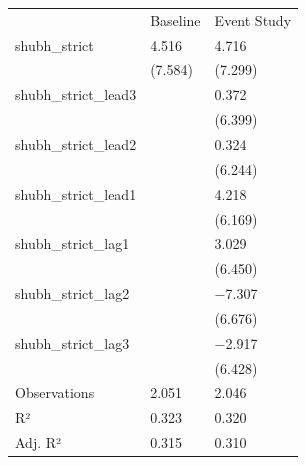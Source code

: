 \begin{tabular}{lll}
& Baseline & Event Study \\
shubh\_strict & \num{4.516} & \num{4.716} \\
& (\num{7.584}) & (\num{7.299}) \\
shubh\_strict\_lead3 &  & \num{0.372} \\
&  & (\num{6.399}) \\
shubh\_strict\_lead2 &  & \num{0.324} \\
&  & (\num{6.244}) \\
shubh\_strict\_lead1 &  & \num{4.218} \\
&  & (\num{6.169}) \\
shubh\_strict\_lag1 &  & \num{3.029} \\
&  & (\num{6.450}) \\
shubh\_strict\_lag2 &  & \num{-7.307} \\
&  & (\num{6.676}) \\
shubh\_strict\_lag3 &  & \num{-2.917} \\
&  & (\num{6.428}) \\
Observations & \num{2,051} & \num{2,046} \\
R² & \num{0.323} & \num{0.320} \\
Adj. R² & \num{0.315} & \num{0.310} \\
\end{tabular}
